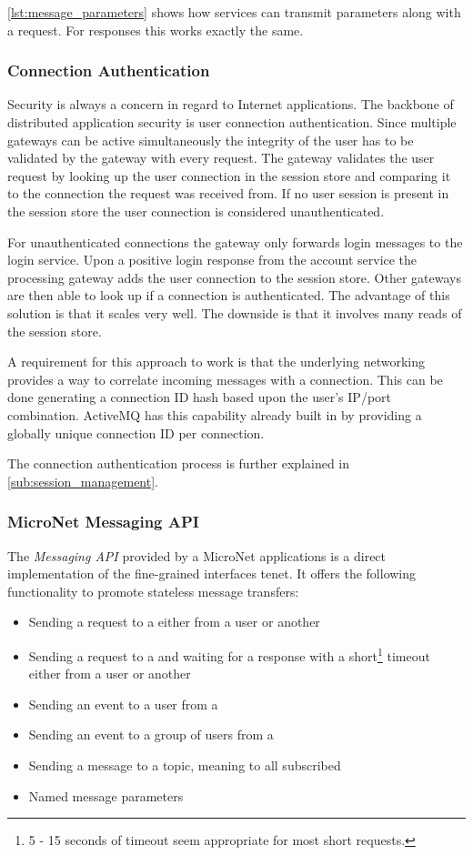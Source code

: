 \autoref{lst:message_parameters} shows how services can transmit parameters
along with a request. For responses this works exactly the same.

\subsubsection{Connection Authentication}

Security is always a concern in regard to Internet applications. The backbone
of distributed application security is user connection authentication.
Since multiple gateways can be active simultaneously the integrity of the user
has to be validated by the gateway with every request. The gateway validates the
user request by looking up the user connection in the session store and
comparing it to the connection the request was received from. If no user session
is present in the session store the user connection is considered
unauthenticated.

For unauthenticated connections the gateway only forwards login messages to the
login service. Upon a positive login response from the account service the
processing gateway adds the user connection to the session store. Other gateways
are then able to look up if a connection is authenticated. The advantage of this
solution is that it scales very well. The downside is that it involves many
reads of the session store.

A requirement for this approach to work is that the underlying networking
provides a way to correlate incoming messages with a connection. This can be
done generating a connection ID hash based upon the user's IP/port combination.
ActiveMQ has this capability already built in by providing a globally unique
connection ID per connection.

The connection authentication process is further explained in
\autoref{sub:session_management}.

\subsubsection{MicroNet Messaging API}

The \textit{Messaging API} provided by a MicroNet applications is a direct implementation
of the fine-grained interfaces tenet. It offers the following functionality to
promote stateless message transfers:

\begin{itemize}
  \item Sending a request to a \ms{} either from a user or another \ms{}
  \item Sending a request to a \ms{} and waiting for a response with a
  short\footnote{5 - 15 seconds of timeout seem appropriate for most short
  requests.} timeout either from a user or another \ms{}
  \item Sending an event to a user from a \ms{}
  \item Sending an event to a group of users from a \ms{}
  \item Sending a message to a topic, meaning to all subscribed \mss{}
  \item Named message parameters
\end{itemize}

